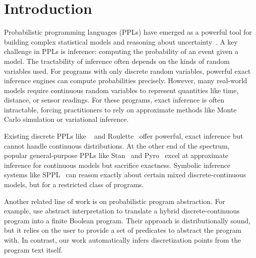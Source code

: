 \section{Introduction}\label{sec:intro}
Probabilistic programming languages (PPLs) have emerged as a powerful tool for building complex statistical models and reasoning about uncertainty~\cite{Moy2025Roulette,Holtzen2020Dice,DeRaedt2007ProbLog,Saad2021SPPL,Carpenter2017Stan,Salvatier2016PyMC3,Bingham2019Pyro,Dillon2017TFP,Tran2016Edward,Tolpin2016Anglican,Goodman2014WebPPL,Pfeffer2009Figaro,Minka2018InferNET,Ge2018Turing,CusumanoTowner2019Gen,Tehrani2020BeanMachine,Goodman2008Church}. A key challenge in PPLs is inference: computing the probability of an event given a model. The tractability of inference often depends on the kinds of random variables used. For programs with only discrete random variables, powerful exact inference engines can compute probabilities precisely. However, many real-world models require continuous random variables to represent quantities like time, distance, or sensor readings. For these programs, exact inference is often intractable, forcing practitioners to rely on approximate methods like Monte Carlo simulation or variational inference. 

Existing discrete PPLs like \Dice~\cite{Holtzen2020Dice} and Roulette~\cite{Moy2025Roulette} offer powerful, exact inference but cannot handle continuous distributions. At the other end of the spectrum, popular general-purpose PPLs like Stan~\cite{Carpenter2017Stan} and Pyro~\cite{Bingham2019Pyro} excel at approximate inference for continuous models but sacrifice exactness. Symbolic inference systems like SPPL~\cite{Saad2021SPPL} can reason exactly about certain mixed discrete-continuous models, but for a restricted class of programs.

Another related line of work is on probabilistic program abstraction.
For example, \textcite{Holtzen2018Abstraction} use abstract interpretation to translate a hybrid discrete-continuous program into a finite Boolean program.
Their approach is distributionally sound, but it relies on the user to provide a set of predicates to abstract the program with.
In contrast, our work automatically infers discretization points from the program text itself.

